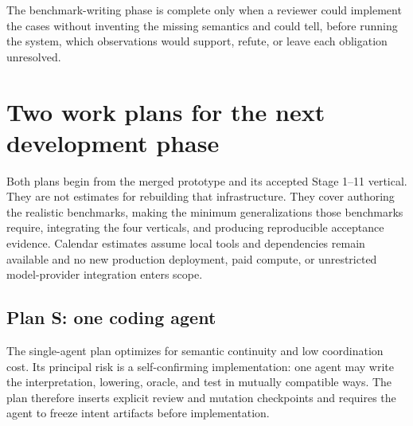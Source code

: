 \documentclass[11pt]{article}
\begin{document}
The benchmark-writing phase is complete only when a reviewer could implement
the cases without inventing the missing semantics and could tell, before
running the system, which observations would support, refute, or leave each
obligation unresolved.

\section{Two work plans for the next development phase}

Both plans begin from the merged prototype and its accepted Stage 1--11
vertical.  They are not estimates for rebuilding that infrastructure.  They
cover authoring the realistic benchmarks, making the minimum generalizations
those benchmarks require, integrating the four verticals, and producing
reproducible acceptance evidence.  Calendar estimates assume local tools and
dependencies remain available and no new production deployment, paid compute,
or unrestricted model-provider integration enters scope.

\subsection{Plan S: one coding agent}

The single-agent plan optimizes for semantic continuity and low coordination
cost.  Its principal risk is a self-confirming implementation: one agent may
write the interpretation, lowering, oracle, and test in mutually compatible
ways.  The plan therefore inserts explicit review and mutation checkpoints and
requires the agent to freeze intent artifacts before implementation.
\end{document}
